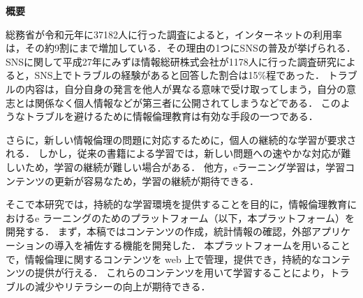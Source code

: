 \begin{center}
{\bf \Large 概要}
\end{center}

総務省が令和元年に37182人に行った調査によると，インターネットの利用率は，その約9割にまで増加している\cite{soumu}．その理由の1つにSNSの普及が挙げられる．
SNSに関して平成27年にみずほ情報総研株式会社が1178人に行った調査研究\cite{mizuho}によると，SNS上でトラブルの経験があると回答した割合は15\%程であった．
トラブルの内容は，自分自身の発言を他人が異なる意味で受け取ってしまう，自分の意志とは関係なく個人情報などが第三者に公開されてしまうなどである．
このようなトラブルを避けるために情報倫理教育は有効な手段の一つである．

さらに，新しい情報倫理の問題に対応するために，個人の継続的な学習が要求される\cite{fluency}．
しかし，従来の書籍による学習では，新しい問題への速やかな対応が難しいため，学習の継続が難しい場合がある．
他方，eラーニング学習は，学習コンテンツの更新が容易なため，学習の継続が期待できる\cite{chieru}．

そこで本研究では，持続的な学習環境を提供することを目的に，情報倫理教育におけるe ラーニングのためのプラットフォーム（以下，本プラットフォーム）を開発する．
まず，本稿ではコンテンツの作成，統計情報の確認，外部アプリケーションの導入を補佐する機能を開発した．
本プラットフォームを用いることで，情報倫理に関するコンテンツを web 上で管理，提供でき，持続的なコンテンツの提供が行える．
これらのコンテンツを用いて学習することにより，トラブルの減少やリテラシーの向上が期待できる．

